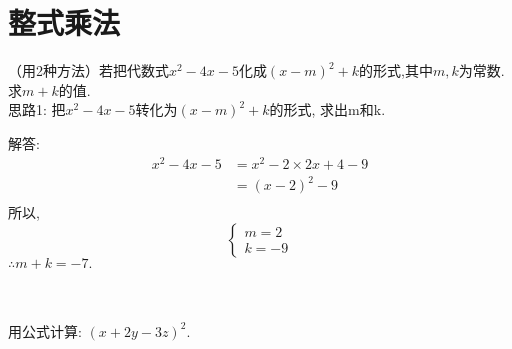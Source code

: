\section{整式乘法}

\item {
    （用2种方法）若把代数式$x^2-4x-5$化成$(x-m)^2+k$的形式,其中$m,k$为常数. 求$m+k$的值.
    \ifshowSolution
        \fangsong{}
        \\
        思路1: 把$x^2-4x-5$转化为$(x-m)^2+k$的形式, 求出m和k.

        解答: 
        \begin{align*}
            x^2-4x-5 &= x^2 - 2\times 2x + 4 - 9 \\
            &= (x-2)^2 - 9 \\
        \end{align*}
        所以,
        \[\left\{ 
            \begin{array}{lc}
                m = 2\\
                k =-9
            \end{array}
        \right.\]
        $\therefore m+k=-7.$
    \else
        \\ \\ \\
    \fi
}

\item {
    用公式计算: $(x+2y-3z)^2$.
    \\ \\ \\
}

\begin{comment}
\item {
    $a=2^{44}, b=3^{33}, c=5^{22}$, 比较$a, b, c$的大小.
    \ifshowSolution
    \fangsong\zihao{4}
    \\
    思路: 把指数化为一样,比较底数大小.

    解答: 
    \begin{align*}
        a &= (2^4)^{11} = 16^{11}\\
        b &= (3^3)^{11} = 27^{11}\\
        c &= (5^2)^{11} = 25^{11}\\
        & 16^{11} < 25^{11} < 27^{11}\\
        &\therefore a < c < b.
    \end{align*}
    \else
        \\ \\ \\
    \fi
}
\end{comment}

